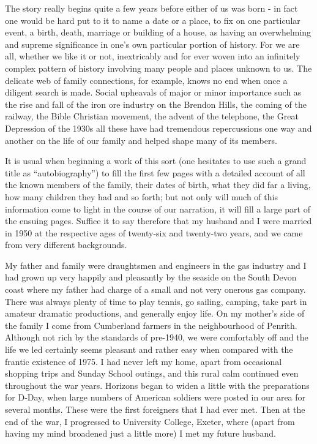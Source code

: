 
The story really begins quite a few years before either of us was born - in fact one would be hard put to it to name a date or a place, to fix on one particular event, a birth, death, marriage or building of a house, as having an overwhelming and supreme significance in one's own particular portion of history. For we are all, whether we like it or not, inextricably and for ever woven into an infinitely complex pattern of history involving many people and places unknown to us. The delicate web of family connections, for example, knows no end when once a diligent search is made. Social upheavals of major or minor importance such as the rise and fall of the iron ore industry on the Brendon Hills, the coming of the railway, the Bible Christian movement, the advent of the telephone, the Great Depression of the 1930s all these have had tremendous repercussions one way and another on the life of our family and helped shape many of its members.

It is usual when beginning a work of this sort (one hesitates to use such a grand title as “autobiography”) to fill the first few pages with a detailed account of all the known members of the family, their dates of birth, what they did far a living, how many children they had and so forth; but not only will much of this information come to light in the course of our narration, it will fill a large part of the ensuing pages. Suffice it to say therefore that my husband and I were married in 1950 at the respective ages of twenty-six and twenty-two years, and we came from very different backgrounds.

My father and family were draughtsmen and engineers in the gas industry and I had grown up very happily and pleasantly by the seaside on the South Devon coast where my father had charge of a small and not very onerous gas company. There was always plenty of time to play tennis, go sailing, camping, take part in amateur dramatic productions, and generally enjoy life. On my mother's side of the family I come from Cumberland farmers in the neighbourhood of Penrith. Although not rich by the standards of pre-1940, we were comfortably off and the life we led certainly seems pleasant and rather easy when compared with the frantic existence of 1975. I had never left my home, apart from occasional shopping trips and Sunday School outings, and this rural calm continued even throughout the war years. Horizons began to widen a little with the preparations for D-Day, when large numbers of American soldiers were posted in our area for several months. These were the first foreigners that I had ever met.  Then at the end of the war, I progressed to University College, Exeter, where (apart from having my mind broadened just a little more) I met my future husband.

